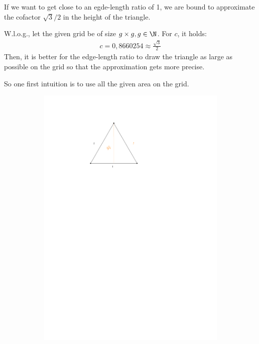 If we want to get close to an egde-length ratio of 1, we are bound to approximate the cofactor $\sqrt{3}/2$ in the height of the triangle. 
\begin{observation}
	W.l.o.g., let the given grid be of size $g \times g, g \in \N$. For $c$, it holds:
	\begin{align*}
		c = 0,8660254 \approx \frac{\sqrt{3}}{2}
	\end{align*}
 	Then, it is better for the edge-length ratio to draw the triangle as large as possible on the grid so that the approximation gets more precise.
\end{observation}
So one first intuition is to use all the given area on the grid. 
\begin{figure}[H]
	\centering
	\begin{subfigure}{0.4\textwidth}
		\centering
		\includegraphics[page=2]{drawings/previous-results.pdf}

\end{subfigure}
\end{figure}
